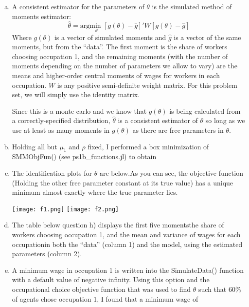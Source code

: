 \documentclass{article}
\newcommand{\usmin}[1]{\underset{#1}{\text{min }}}
\begin{document}
\begin{enumerate}[a)]
        \item A consistent estimator for the parameters of $\theta$ is the simulated method of moments estimator:
        \[
                \hat{\theta} = \text{arg}\usmin{\theta}\left[g(\theta) - \hat{g}\right]'W\left[g(\theta) - \hat{g}\right]
        \]
        Where $g(\theta)$ is a vector of simulated moments and $\hat{g}$ is a vector of the same moments, but from the ``data''. The first moment is the share of workers choosing occupation 1, and the remaining moments (with the number of moments depending on the number of parameters we allow to vary) are the means and higher-order central moments of wages for workers in each occupation. $W$ is any positive semi-definite weight matrix. For this problem set, we will simply use the identity matrix.

        Since this is a monte carlo and we know that $g(\theta)$ is being calculated from a correctly-specified distribution, $\hat{\theta}$ is a consistent estimator of $\theta$ so long as we use at least as many moments in $g(\theta)$ as there are free parameters in $\theta$.

        \item Holding all but $\mu_1$ and $\rho$ fixed, I performed a box minimization of SMMObjFun() (see ps1b\_functions.jl) to obtain 
        
        \item The identification plots for $\hat{\theta}$ are below.As you can see, the objective function (Holding the other free parameter constant at its true value) has a unique minimum almost exactly where the true parameter lies.
        \begin{center}
                \texttt{[image: f1.png]}
                \texttt{[image: f2.png]}
        \end{center}

        \item The table below question h) displays the first five moments\textemdash the share of workers choosing occupation 1, and the mean and variance of wages for each occupation\textemdash in both the ``data'' (column 1) and the model, using the estimated parameters (column 2).

        \item A minimum wage in occupation 1 is written into the SimulateData() function with a default value of negative infinity. Using this option and the occupational choice objective function that was used to find $\theta$ such that 60\% of agents chose occupation 1, I found that a minimum wage of 
        \begin{center} 
                 
        \end{center} 
\end{enumerate}
\end{document}
